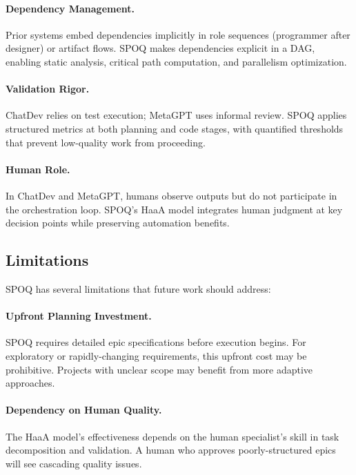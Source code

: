 \paragraph{Dependency Management.}
Prior systems embed dependencies implicitly in role sequences (programmer
after designer) or artifact flows. SPOQ makes dependencies explicit in a
DAG, enabling static analysis, critical path computation, and parallelism
optimization.

\paragraph{Validation Rigor.}
ChatDev relies on test execution; MetaGPT uses informal review.
SPOQ applies structured metrics at both planning and code stages,
with quantified thresholds that prevent low-quality work from proceeding.

\paragraph{Human Role.}
In ChatDev and MetaGPT, humans observe outputs but do not participate
in the orchestration loop. SPOQ's HaaA model integrates human judgment
at key decision points while preserving automation benefits.

\subsection{Limitations}
\label{subsec:limitations}

SPOQ has several limitations that future work should address:

\paragraph{Upfront Planning Investment.}
SPOQ requires detailed epic specifications before execution begins.
For exploratory or rapidly-changing requirements, this upfront cost
may be prohibitive. Projects with unclear scope may benefit from
more adaptive approaches.

\paragraph{Dependency on Human Quality.}
The HaaA model's effectiveness depends on the human specialist's
skill in task decomposition and validation. A human who approves
poorly-structured epics will see cascading quality issues.

